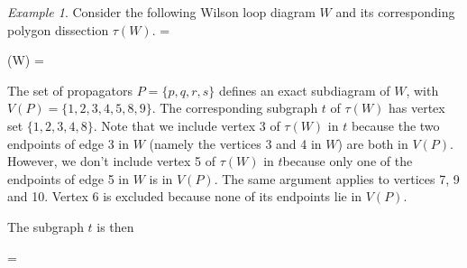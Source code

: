 \documentclass[11pt]{article}
\newcommand{\drawWLD}[2]{

\pgfmathsetmacro{\n}{#1}
\pgfmathsetmacro{\radius}{#2}
\pgfmathsetmacro{\angle}{360/\n}
\draw (0,0) circle (\radius);
    \foreach \i in {1,2,...,\n} {
      \draw (\angle*\i:\radius) node {$\bullet$};
    }

}
\newcommand{\drawpolypart}[2]{
\pgfmathsetmacro{\n}{#1}
\pgfmathsetmacro{\radius}{#2}
\pgfmathsetmacro{\angle}{360/\n}
    \foreach \i in {1,2,...,\n} {
      \draw (\angle*\i+ \angle/2:\radius) node {$\bullet$};
     \pgfmathsetmacro{\x}{\angle*\i - \angle/2}
      \pgfmathsetmacro{\concave}{((\n-1.5)/\n)}
      \draw (\x:\radius cm) .. controls (\angle *\i: \concave* \radius cm) .. (\x + \angle:\radius cm);
    }

}
\newcommand{\drawprop}[4]{
\pgfmathsetmacro{\r}{#1}
\pgfmathsetmacro{\bumpr}{#2}
\pgfmathsetmacro{\s}{#3}
\pgfmathsetmacro{\bumps}{#4}
\pgfmathsetmacro{\perturbe}{\angle/\n}

\begin{scope}
\draw[propagator] (\angle*\r + \angle/2 + \bumpr*\perturbe:\radius) -- (\angle*\s + \angle/2 + \bumps*\perturbe:\radius);
\end{scope}
}
\newcommand{\drawchord}[2]{
\pgfmathsetmacro{\r}{#1}
\pgfmathsetmacro{\s}{#2}

\begin{scope}
\draw (\angle*\r + \angle/2:\radius) -- (\angle*\s + \angle/2:\radius);
\end{scope}
}
\newcommand{\drawnumbers}{
  \foreach \i in {1,2,...,\n} {
  \pgfmathsetmacro{\x}{\angle*\i}
  \draw (\x:\radius*1.15) node {\footnotesize \i};
}
}
\newcommand{\drawnumbersshift}{
  \foreach \i in {1,2,...,\n} {
  \pgfmathsetmacro{\x}{\angle*\i + \angle/2}
  \draw (\x:\radius*1.15) node {\footnotesize \i};
}
}
\def\bas #1\eas{\begin{align*} #1 \end{align*}}
\theoremstyle{remark}
\newtheorem{eg}[thm]{Example}
\theoremstyle{definition}
\begin{document}
\begin{eg}\label{eg:subtrees}
Consider the following Wilson loop diagram $W$ and its corresponding polygon dissection $\tau(W)$. 
\bas W =   \; \qquad
\tau(W) =  \eas

The set of propagators $P= \{p,q,r,s \}$ defines an exact subdiagram of $W$, with $V(P) = \{1,2,3,4,5,8,9\}$.  The corresponding subgraph $t$ of $\tau(W)$ has vertex set $\{1, 2,3, 4, 8\}$. Note that we include vertex 3 of $\tau(W)$ in $t$ because the two endpoints of edge 3 in $W$ (namely the vertices 3 and 4 in $W$) are both in $V(P)$. However, we don't include vertex 5 of $\tau(W)$ in $t$because only one of the endpoints of edge 5 in $W$ is in $V(P)$. The same argument applies to vertices 7, 9 and 10. Vertex 6 is excluded because none of its endpoints lie in $V(P)$. 

The subgraph $t$ is then 

\bas t = 
 \eas


\end{eg}
\end{document}
